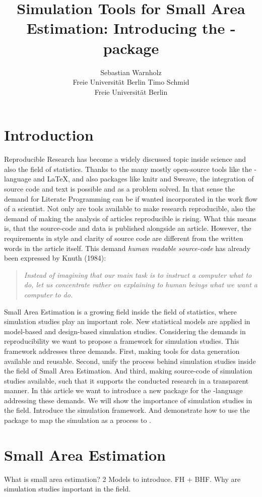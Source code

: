 \documentclass[article]{ajs}
\author{Sebastian Warnholz\\ Freie Universit\"at Berlin \And 
        Timo Schmid \\ Freie Universit\"at Berlin}
\title{Simulation Tools for Small Area Estimation: Introducing the \proglang{R}-package \proglang{saeSim}}
\begin{document}


\section{Introduction}
Reproducible Research has become a widely discussed topic inside science and also the field of statistics. Thanks to the many mostly open-source tools like the -language and \LaTeX, and also packages like knitr and Sweave, the integration of source code and text is possible and as a problem solved. In that sense the demand for Literate Programming can be if wanted incorporated in the work flow of a scientist. Not only are tools available to make research reproducible, also the demand of making the analysis of articles reproducible is rising. What this means is, that the source-code and data is published alongside an article. However, the requirements in style and clarity of source code are different from the written words in the article itself. This demand \textit{human readable source-code} has already been expressed by Knuth (1984): 
\begin{quote}
\textit{Instead of imagining that our main task is to instruct a computer what to do, let us concentrate rather on explaining to human beings what we want a computer to do.}
\end{quote}
Small Area Estimation is a growing field inside the field of statistics, where simulation studies play an important role. New statistical models are applied in model-based and design-based simulation studies. Considering the demands in reproducibility we want to propose a framework for simulation studies. This framework addresses three demands. First, making tools for data generation available and reusable. Second, unify the process behind simulation studies inside the field of Small Area Estimation. And third, making source-code of simulation studies available, such that it supports the conducted research in a transparent manner.
In this article we want to introduce a new package for the -language addressing these demands. We will show the importance of simulation studies in the field. Introduce the simulation framework. And demonstrate how to use the package to map the simulation as a process to .

\section{Small Area Estimation}
What is small area estimation? 2 Models to introduce. FH + BHF. Why are simulation studies important in the field.
\end{document}
